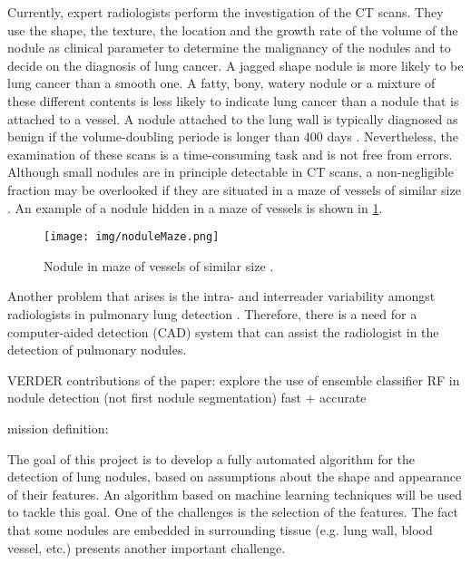 Currently, expert radiologists perform the investigation of the
CT scans. They use the shape, the texture, the location and the growth rate of
the volume of the nodule as clinical parameter to determine the malignancy of
the nodules and to decide on the diagnosis of lung cancer. A jagged shape
nodule is more likely to be lung cancer than a smooth one. A fatty, bony,
watery nodule or a mixture of these different contents is less likely to
indicate lung cancer than a nodule that is attached to a vessel. A nodule
attached to the lung wall is typically diagnosed as benign if the
volume-doubling periode is longer than 400 days \cite{wu}. Nevertheless, the
examination of these scans is a time-consuming task and is not free from errors.
Although small nodules are in principle detectable in CT scans, a non-negligible
fraction may be overlooked if they are situated in a maze of vessels of similar
size \cite{ozekes}. An example of a nodule hidden in a maze of vessels is shown
in \ref{nodmaze}.
\begin{figure}[htp]
\begin{center}
  \texttt{[image: img/noduleMaze.png]}
  \caption{Nodule in maze of vessels of similar size \cite{noduleMaze}.}
  \label{nodmaze}
\end{center}
\end{figure}
Another problem that arises is the intra- and interreader variability
amongst radiologists in pulmonary lung detection \cite{armato} \cite{hens}. Therefore,
there is a need for a computer-aided detection (CAD) system that can assist the
radiologist in the detection of pulmonary nodules.

VERDER
contributions of the paper: explore the use of ensemble classifier RF in nodule detection (not first nodule
segmentation)
fast + accurate


mission definition:

The goal of this project is to develop a fully automated algorithm for the
detection of lung nodules, based on assumptions about the shape and appearance of their
features. An algorithm based on machine learning techniques will be used to
tackle this goal. One of the challenges is the selection of the features. The
fact that some nodules are embedded in surrounding tissue (e.g.
lung wall, blood vessel, etc.) presents another important challenge.



